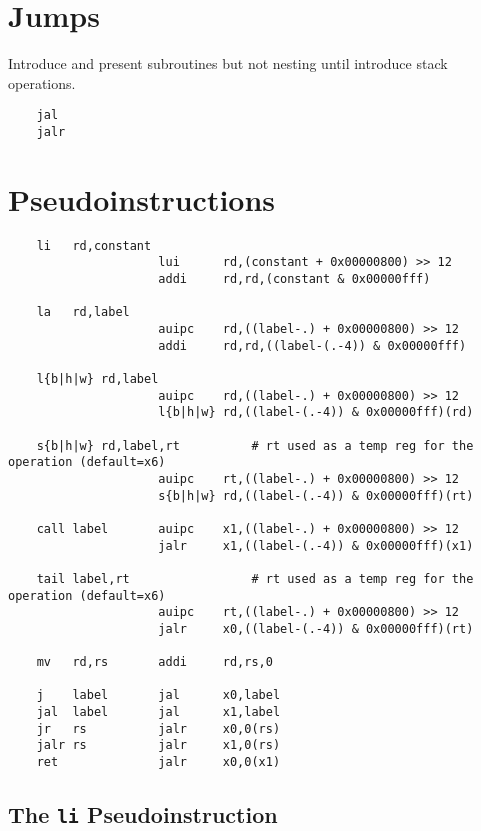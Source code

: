 \section{Jumps}

Introduce and present subroutines but not nesting until introduce stack operations.

\label{uguide:jal}
\label{uguide:jalr}
{\small
\begin{verbatim}
    jal
    jalr
\end{verbatim}
}



\section{Pseudoinstructions}

{\small
\begin{verbatim}
    li   rd,constant
                     lui      rd,(constant + 0x00000800) >> 12
                     addi     rd,rd,(constant & 0x00000fff)

    la   rd,label
                     auipc    rd,((label-.) + 0x00000800) >> 12
                     addi     rd,rd,((label-(.-4)) & 0x00000fff)

    l{b|h|w} rd,label
                     auipc    rd,((label-.) + 0x00000800) >> 12
                     l{b|h|w} rd,((label-(.-4)) & 0x00000fff)(rd)

    s{b|h|w} rd,label,rt          # rt used as a temp reg for the operation (default=x6)
                     auipc    rt,((label-.) + 0x00000800) >> 12
                     s{b|h|w} rd,((label-(.-4)) & 0x00000fff)(rt)

    call label       auipc    x1,((label-.) + 0x00000800) >> 12
                     jalr     x1,((label-(.-4)) & 0x00000fff)(x1)

    tail label,rt                 # rt used as a temp reg for the operation (default=x6)
                     auipc    rt,((label-.) + 0x00000800) >> 12
                     jalr     x0,((label-(.-4)) & 0x00000fff)(rt)

    mv   rd,rs       addi     rd,rs,0
 
    j    label       jal      x0,label
    jal  label       jal      x1,label
    jr   rs          jalr     x0,0(rs)
    jalr rs          jalr     x1,0(rs)
    ret              jalr     x0,0(x1)
\end{verbatim}
}

\subsection{The {\tt li} Pseudoinstruction}

